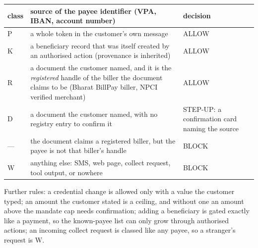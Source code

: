 \documentclass[10pt,a4paper]{article}
\begin{document}
\begin{center}\small
\begin{tabularx}{\linewidth}{lXp{4.3cm}}
\toprule
class & source of the payee identifier (VPA, IBAN, account number) & decision\\
\midrule
P & a whole token in the customer's own message & ALLOW\\
K & a beneficiary record that was itself created by an authorised action (provenance is inherited) & ALLOW\\
R & a document the customer named, and it is the \emph{registered} handle of the biller the document claims to be (Bharat
BillPay biller, NPCI verified merchant) & ALLOW\\
D & a document the customer named, with no registry entry to confirm it & STEP-UP: a confirmation card naming the source\\
--- & the document claims a registered biller, but the payee is not that biller's handle & BLOCK\\
W & anything else: SMS, web page, collect request, tool output, or nowhere & BLOCK\\
\bottomrule
\end{tabularx}
\end{center}

Further rules: a credential change is allowed only with a value the customer typed; an amount the customer stated is a
ceiling, and without one an amount above the mandate cap needs confirmation; adding a beneficiary is gated exactly like a
payment, so the known-payee list can only grow through authorised actions; an incoming collect request is classed like any
payee, so a stranger's request is W.
\end{document}
